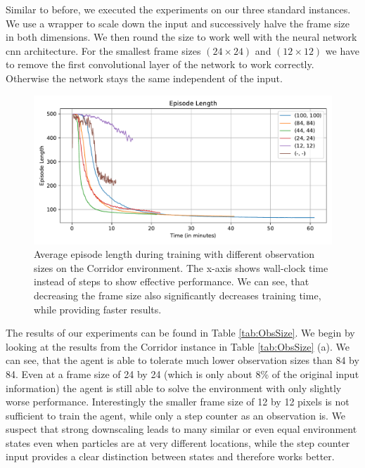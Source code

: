 Similar to before, we executed the experiments on our three standard instances. We use a wrapper to scale down the input and successively halve the frame size in both dimensions. We then round the size to work well with the neural network cnn architecture. For the smallest frame sizes $(24 \times 24)$ and $(12 \times 12)$ we have to remove the first convolutional layer of the network to work correctly. Otherwise the network stays the same independent of the input.

\begin{figure}[htp]
    \begin{center}
        \includegraphics[clip, width=0.95\columnwidth]{figures/evaluation/observations/maze0318_ep_len_time.pdf}
    \end{center}
    \caption[Episode Length on the Corridor Environment using Different Observation Sizes]{Average episode length during training with different observation sizes on the Corridor environment. The x-axis shows wall-clock time instead of steps to show effective performance. We can see, that decreasing the frame size also significantly decreases training time, while providing faster results.} \label{fig:ObsSize/Maze0318/EpLen}
\end{figure}


The results of our experiments can be found in Table \ref{tab:ObsSize}. We begin by looking at the results from the Corridor instance in Table \ref{tab:ObsSize} (a). We can see, that the agent is able to tolerate much lower observation sizes than 84 by 84. Even at a frame size of 24 by 24 (which is only about 8\% of the original input information) the agent is still able to solve the environment with only slightly worse performance. Interestingly the smaller frame size of 12 by 12 pixels is not sufficient to train the agent, while only a step counter as an observation is. We suspect that strong downscaling leads to many similar or even equal environment states even when particles are at very different locations, while the step counter input provides a clear distinction between states and therefore works better.


